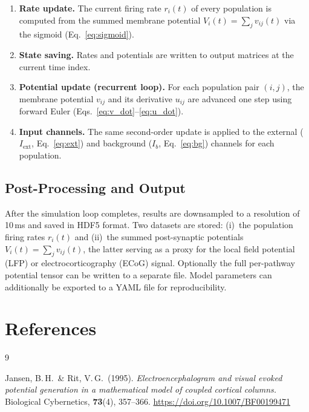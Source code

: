 \documentclass[12pt, a4paper]{article}
\begin{document}
\begin{enumerate}
    \item \textbf{Rate update.}  The current firing rate $r_i(t)$ of every
    population is computed from the summed membrane potential $V_i(t) =
    \sum_j v_{ij}(t)$ via the sigmoid (Eq.~\ref{eq:sigmoid}).

    \item \textbf{State saving.}  Rates and potentials are written to output
    matrices at the current time index.

    \item \textbf{Potential update (recurrent loop).}  For each population pair
    $(i,j)$, the membrane potential $v_{ij}$ and its derivative $u_{ij}$ are
    advanced one step using forward Euler (Eqs.~\ref{eq:v_dot}--\ref{eq:u_dot}).

    \item \textbf{Input channels.}  The same second-order update is applied to
    the external ($I_\text{ext}$, Eq.~\ref{eq:ext}) and background ($I_b$,
    Eq.~\ref{eq:bg}) channels for each population.
\end{enumerate}

\subsection{Post-Processing and Output}

After the simulation loop completes, results are downsampled to a resolution of
10\,ms and saved in HDF5 format.  Two datasets are stored: (i)~the population
firing rates $r_i(t)$ and (ii)~the summed post-synaptic potentials
$V_i(t) = \sum_j v_{ij}(t)$, the latter serving as a proxy for the local field
potential (LFP) or electrocorticography (ECoG) signal.  Optionally the full
per-pathway potential tensor can be written to a separate file.  Model parameters
can additionally be exported to a YAML file for reproducibility.

\section*{References}

\begin{thebibliography}{9}

Jansen, B.\,H.\ \& Rit, V.\,G.\ (1995).
\textit{Electroencephalogram and visual evoked potential generation in a
mathematical model of coupled cortical columns.}
Biological Cybernetics, \textbf{73}(4), 357--366.
\url{https://doi.org/10.1007/BF00199471}

\end{thebibliography}
\end{document}

